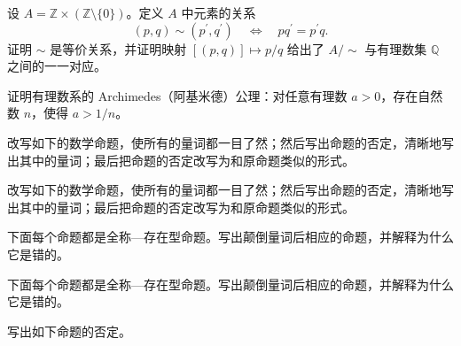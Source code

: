 \noindent\begin{minipage}{\textwidth}
设 $A=\mathbb Z\times(\mathbb Z\setminus\{0\})$。定义 $A$ 中元素的关系\[(p,q)\sim(p^{\prime},q^{\prime})\quad\Longleftrightarrow\quad pq^{\prime}=p^{\prime}q.\]证明 $\sim$ 是等价关系，并证明映射 $[(p,q)]\mapsto p/q$ 给出了 $A/\!\sim$ 与有理数集 $\mathbb Q$ 之间的一一对应。
\end{minipage}\par\vfill
\noindent\begin{minipage}{\textwidth}
证明有理数系的 Archimedes（阿基米德）公理：对任意有理数 $a>0$，存在自然数 $n$，使得 $a>1/n$。
\end{minipage}\par\vfill
\newpage
\noindent\begin{minipage}{\textwidth}
改写如下的数学命题，使所有的量词都一目了然；然后写出命题的否定，清晰地写出其中的量词；最后把命题的否定改写为和原命题类似的形式。
\end{minipage}\par\vfill
\noindent\begin{minipage}{\textwidth}
改写如下的数学命题，使所有的量词都一目了然；然后写出命题的否定，清晰地写出其中的量词；最后把命题的否定改写为和原命题类似的形式。
\end{minipage}\par\vfill
\noindent\begin{minipage}{\textwidth}
下面每个命题都是全称—存在型命题。写出颠倒量词后相应的命题，并解释为什么它是错的。
\end{minipage}\par\vfill
\noindent\begin{minipage}{\textwidth}
下面每个命题都是全称—存在型命题。写出颠倒量词后相应的命题，并解释为什么它是错的。
\end{minipage}\par\vfill
\newpage
\noindent\begin{minipage}{\textwidth}
写出如下命题的否定。
\end{minipage}\par\vfill
